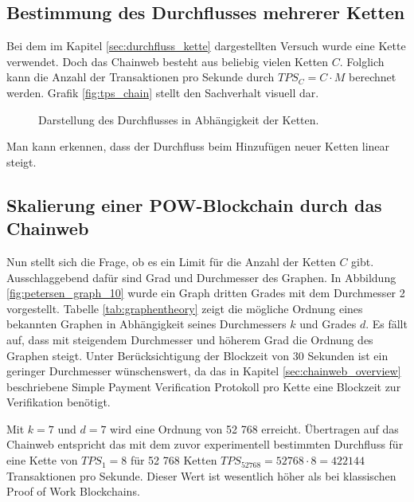 \subsection{Bestimmung des Durchflusses mehrerer Ketten}
Bei dem im Kapitel \eqref{sec:durchfluss_kette} dargestellten Versuch wurde eine Kette verwendet. Doch das Chainweb besteht aus beliebig vielen Ketten $C$. Folglich kann die Anzahl der Transaktionen pro Sekunde durch $TPS_C = C \cdot M$ berechnet werden. Grafik \eqref{fig:tps_chain} stellt den Sachverhalt visuell dar.

\begin{figure}[h!]
\caption{Darstellung des Durchflusses in Abhängigkeit der Ketten.}
\label{fig:tps_chain}
\end{figure}

Man kann erkennen, dass der Durchfluss beim Hinzufügen neuer Ketten linear steigt.

\subsection{Skalierung einer POW-Blockchain durch das Chainweb}
Nun stellt sich die Frage, ob es ein Limit für die Anzahl der Ketten $C$ gibt. Ausschlaggebend dafür sind Grad und Durchmesser des Graphen. In Abbildung \eqref{fig:petersen_graph_10} wurde ein Graph dritten Grades mit dem Durchmesser 2 vorgestellt. Tabelle \eqref{tab:graphentheory} zeigt die mögliche Ordnung eines bekannten Graphen in Abhängigkeit seines Durchmessers $k$ und Grades $d$. 
Es fällt auf, dass mit steigendem Durchmesser und höherem Grad die Ordnung des Graphen steigt. Unter Berücksichtigung der Blockzeit von 30 Sekunden ist ein geringer Durchmesser wünschenswert, da das in Kapitel \eqref{sec:chainweb_overview} beschriebene Simple Payment Verification Protokoll pro Kette eine Blockzeit zur Verifikation benötigt.

Mit $k = 7$ und $d = 7$ wird eine Ordnung von 52 768 erreicht. Übertragen auf das Chainweb entspricht das mit dem zuvor experimentell bestimmten Durchfluss für eine Kette von $TPS_{1} = 8$ für 52 768 Ketten $TPS_{52768} = 52768 \cdot 8 = 422 144$ Transaktionen pro Sekunde. Dieser Wert ist wesentlich höher als bei klassischen Proof of Work Blockchains.

